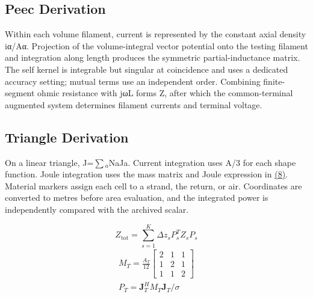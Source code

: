 \documentclass[journal,10pt]{IEEEtran}
\begin{document}
\subsection*{Peec Derivation}
\hypertarget{S1.peec_derivation.heading}{}
Within each volume filament, current is represented by the constant axial density iα/Aα. Projection of the volume-integral vector potential onto the testing filament and integration along length produces the symmetric partial-inductance matrix. The self kernel is integrable but singular at coincidence and uses a dedicated accuracy setting; mutual terms use an independent order. Combining finite-segment ohmic resistance with jωL forms Z, after which the common-terminal augmented system determines filament currents and terminal voltage.


\subsection*{Triangle Derivation}
\hypertarget{S1.triangle_derivation.heading}{}
On a linear triangle, J=\(\sum\)\(_a\)NaJa. Current integration uses A/3 for each shape function. Joule integration uses the mass matrix and Joule expression in \href{paper_en_ieee.pdf#E09}{(8)}. Material markers assign each cell to a strand, the return, or air. Coordinates are converted to metres before area evaluation, and the integrated power is independently compared with the archived scalar.


\hypertarget{E06}{}\begin{equation}Z_{\mathrm{tot}}=\sum_{s=1}^{K}\Delta z_s P_s^T Z_s P_s\tag{7}\label{eq:E06}\end{equation}
\hypertarget{E09}{}
\begin{equation}
\begin{gathered}
M_T=\frac{A_T}{12}\begin{bmatrix}2&1&1\\1&2&1\\1&1&2\end{bmatrix} \\
P_T=\mathbf J_T^H M_T\mathbf J_T/\sigma
\end{gathered}
\tag{8}\label{eq:E09}
\end{equation}
\end{document}
